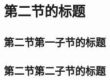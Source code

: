 
\section{第二节的标题}

\zhlipsum[1]

\subsection{第二节第一子节的标题}

\zhlipsum

\subsection{第二节第二子节的标题}

\zhlipsum
